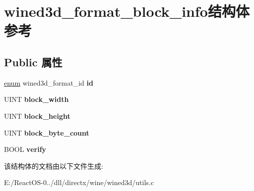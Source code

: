 \hypertarget{structwined3d__format__block__info}{}\section{wined3d\+\_\+format\+\_\+block\+\_\+info结构体 参考}
\label{structwined3d__format__block__info}
\subsection*{Public 属性}
\begin{DoxyCompactItemize}
\item 
\mbox{\label{structwined3d__format__block__info_a242e566f2a683532ae63f71b8e9a59c8}} 
\hyperlink{interfaceenum}{enum} wined3d\+\_\+format\+\_\+id {\bfseries id}
\item 
\mbox{\label{structwined3d__format__block__info_a89f59d62d6cc185b07856e5396a98249}} 
U\+I\+NT {\bfseries block\+\_\+width}
\item 
\mbox{\label{structwined3d__format__block__info_abfb194a33c66bd1dfd6b8c60b1c6bb65}} 
U\+I\+NT {\bfseries block\+\_\+height}
\item 
\mbox{\label{structwined3d__format__block__info_a096daeb1e0d59e82a3acccd87d2957c9}} 
U\+I\+NT {\bfseries block\+\_\+byte\+\_\+count}
\item 
\mbox{\label{structwined3d__format__block__info_abde1312fa2301fe2e2ecd9fddfdf6b45}} 
B\+O\+OL {\bfseries verify}
\end{DoxyCompactItemize}


该结构体的文档由以下文件生成\+:\begin{DoxyCompactItemize}
\item 
E\+:/\+React\+O\+S-\/0../dll/directx/wine/wined3d/utils.\+c\end{DoxyCompactItemize}
